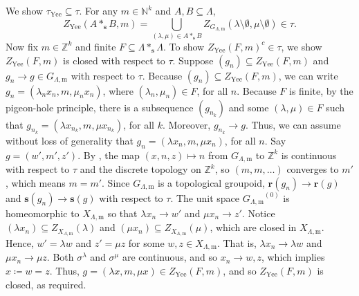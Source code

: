 \documentclass[11pt]{amsart}
\theoremstyle{definition}
\numberwithin{thm}{section}
\numberwithin{equation}{section}
\newcommand{\compl}[1]{#1^c}
\newcommand{\Z}{\mathbb{Z}}
\newcommand{\N}{\mathbb{N}}
\newcommand{\range}{\mathbf{r}}
\newcommand{\source}{\mathbf{s}}
\newcommand{\ofYeend}{\mathrm{Yee}}
\newcommand{\M}{\mathrm{m}}
\newcommand{\PS}[2]{X_{#2, #1}}
\newcommand{\PG}[2]{{G_{#2, #1}}}
\newcommand{\unitspace}[1]{#1^{(0)}}
\newcommand{\Fellin}[2]{Z_{#1}\left(#2\right)}
\newcommand{\Fellgpd}[5]{Z_{#1}\left(#2 \setminus #3, #4 \setminus #5\right)}
\begin{document}
We show $\tau_\ofYeend \subseteq \tau$.
For any $m \in \N^k$ and $A, B \subseteq \Lambda$,
\[
Z_\ofYeend(A *_{\source} B, m) 
= \bigcup_{(\lambda, \mu) \in A *_{\source} B}
\Fellgpd{\PG{\M}{\Lambda}}{\lambda}{\emptyset}{\mu}{\emptyset}
\in \tau.
\]
Now fix $m \in \Z^k$ and finite $F \subseteq \Lambda *_{\source} \Lambda$.
To show $\compl{Z_\ofYeend(F, m)} \in \tau$, we show $Z_\ofYeend(F, m)$ is closed with respect to $\tau$. 
Suppose $(g_n) \subseteq Z_\ofYeend(F, m)$ and $g_n \to g \in \PG{\M}{\Lambda}$ with respect to $\tau$. 
Because $(g_n) \subseteq Z_\ofYeend(F, m)$, we can write $g_n = (\lambda_n x_n, m, \mu_n x_n)$, where $(\lambda_n, \mu_n) \in F$, for all $n$.
Because $F$ is finite, by the pigeon-hole principle, there is a subsequence $(g_{n_k})$ and some $(\lambda, \mu) \in F$ such that $g_{n_k} = (\lambda x_{n_k}, m, \mu x_{n_k})$, for all $k$.
Moreover, $g_{n_k} \to g$. 
Thus, we can assume without loss of generality that $g_n = (\lambda x_n, m, \mu x_n)$, for all $n$.
Say $g = (w', m', z')$.
By \cite[Proposition 5.12(b)]{RW17}, the map $(x, n, z) \mapsto n$ from $\PG{\M}{\Lambda}$ to $\Z^k$ is continuous with respect to $\tau$ and the discrete topology on $\Z^k$, so $(m, m, \dots)$ converges to $m'$, which means $m = m'$.
Since $\PG{\M}{\Lambda}$ is a topological groupoid, $\range(g_n) \to \range(g)$ and $\source(g_n) \to \source(g)$ with respect to $\tau$.
The unit space $\unitspace{\PG{\M}{\Lambda}}$ is homeomorphic to $\PS{\M}{\Lambda}$ so that $\lambda x_n \to w'$ and $\mu x_n \to z'$.
Notice $(\lambda x_n) \subseteq \Fellin{\PS{\M}{\Lambda}}{\lambda}$ and $(\mu x_n) \subseteq  \Fellin{\PS{\M}{\Lambda}}{\mu}$, which are closed in $\PS{\M}{\Lambda}$. 
Hence, $w' = \lambda w$ and $z' = \mu z$ for some $w, z \in \PS{\M}{\Lambda}$.
That is, $\lambda x_n \to \lambda w$ and $\mu x_n \to \mu z$.
Both $\sigma^\lambda$ and $\sigma^\mu$ are continuous, and so $x_n \to w, z$, which implies $x \coloneqq w = z$. 
Thus, $g = (\lambda x, m, \mu x) \in Z_\ofYeend(F, m)$, and so $Z_\ofYeend(F, m)$ is closed, as required.
\end{document}
